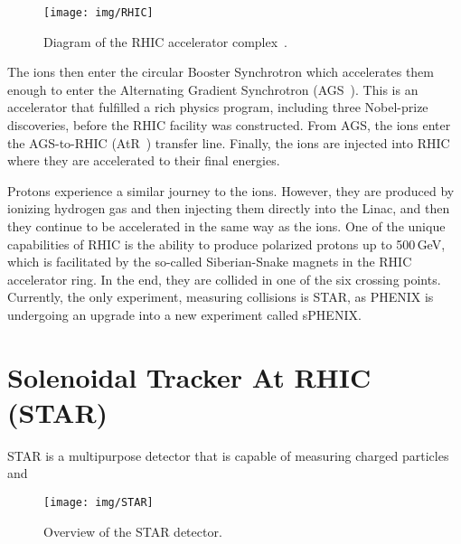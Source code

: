 \begin{figure}[htb]
\begin{center}
 \texttt{[image: img/RHIC]}\\
\end{center}
\caption{\label{RHICcomplex}Diagram of the RHIC accelerator complex~\cite{RHICpages}.}
\end{figure}

The ions then enter the circular Booster Synchrotron which accelerates them enough to enter the Alternating Gradient Synchrotron (AGS~\cite{AGS}). This is an accelerator that fulfilled a rich physics program, including three Nobel-prize discoveries, before the RHIC facility was constructed. From AGS, the ions enter the AGS-to-RHIC (AtR~\cite{AtR}) transfer line. Finally, the ions are injected into RHIC where they are accelerated to their final energies. 

Protons experience a similar journey to the ions. However, they are produced by ionizing hydrogen gas and then injecting them directly into the Linac, and then they continue to be accelerated in the same way as the ions. One of the unique capabilities of RHIC is the ability to produce polarized protons up to 500$\,$GeV, which is facilitated by the so-called Siberian-Snake magnets in the RHIC accelerator ring. In the end, they are collided in one of the six crossing points. Currently, the only experiment, measuring collisions is STAR, as PHENIX is undergoing an upgrade into a new experiment called sPHENIX\@.





\section{Solenoidal Tracker At RHIC (STAR)}

STAR is a multipurpose detector that is capable of measuring charged particles and 

\begin{figure}[htb]
\begin{center}
 \texttt{[image: img/STAR]}\\
\end{center}
\caption{\label{STAR}Overview of the STAR detector.}
\end{figure}

